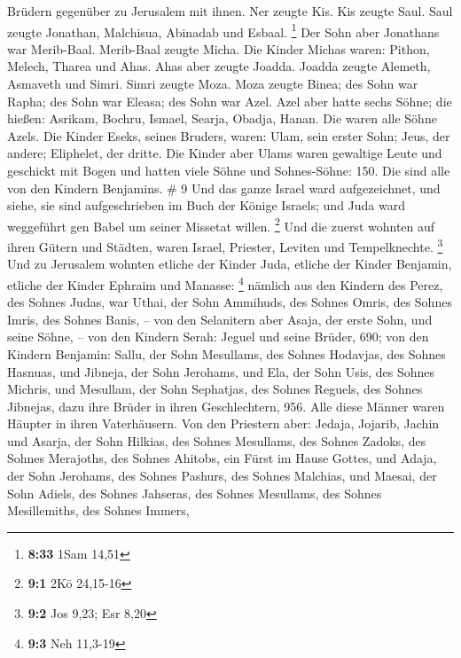 Brüdern gegenüber zu Jerusalem mit ihnen.  Ner zeugte
Kis. Kis zeugte Saul. Saul zeugte Jonathan, Malchisua, Abinadab und
Esbaal. \footnote{\textbf{8:33} 1Sam 14,51}  Der Sohn
aber Jonathans war Merib-Baal. Merib-Baal zeugte Micha. 
Die Kinder Michas waren: Pithon, Melech, Tharea und Ahas.
 Ahas aber zeugte Joadda. Joadda zeugte Alemeth, Asmaveth
und Simri. Simri zeugte Moza.  Moza zeugte Binea; des
Sohn war Rapha; des Sohn war Eleasa; des Sohn war Azel. 
Azel aber hatte sechs Söhne; die hießen: Asrikam, Bochru, Ismael,
Searja, Obadja, Hanan. Die waren alle Söhne Azels.  Die
Kinder Eseks, seines Bruders, waren: Ulam, sein erster Sohn; Jeus, der
andere; Eliphelet, der dritte.  Die Kinder aber Ulams
waren gewaltige Leute und geschickt mit Bogen und hatten viele Söhne und
Sohnes-Söhne: 150. Die sind alle von den Kindern Benjamins. \# 9
 Und das ganze Israel ward aufgezeichnet, und siehe, sie
sind aufgeschrieben im Buch der Könige Israels; und Juda ward weggeführt
gen Babel um seiner Missetat willen. \footnote{\textbf{9:1} 2Kö 24,15-16}
 Und die zuerst wohnten auf ihren Gütern und Städten,
waren Israel, Priester, Leviten und Tempelknechte. \footnote{\textbf{9:2}
  Jos 9,23; Esr 8,20}  Und zu Jerusalem wohnten etliche
der Kinder Juda, etliche der Kinder Benjamin, etliche der Kinder Ephraim
und Manasse: \footnote{\textbf{9:3} Neh 11,3-19}  nämlich
aus den Kindern des Perez, des Sohnes Judas, war Uthai, der Sohn
Ammihuds, des Sohnes Omris, des Sohnes Imris, des Sohnes Banis, --
 von den Selanitern aber Asaja, der erste Sohn, und seine
Söhne, --  von den Kindern Serah: Jeguel und seine Brüder,
690;  von den Kindern Benjamin: Sallu, der Sohn Mesullams,
des Sohnes Hodavjas, des Sohnes Hasnuas,  und Jibneja, der
Sohn Jerohams, und Ela, der Sohn Usis, des Sohnes Michris, und Mesullam,
der Sohn Sephatjas, des Sohnes Reguels, des Sohnes Jibnejas,
 dazu ihre Brüder in ihren Geschlechtern, 956. Alle diese
Männer waren Häupter in ihren Vaterhäusern.  Von den
Priestern aber: Jedaja, Jojarib, Jachin  und Asarja, der
Sohn Hilkias, des Sohnes Mesullams, des Sohnes Zadoks, des Sohnes
Merajoths, des Sohnes Ahitobs, ein Fürst im Hause Gottes,
 und Adaja, der Sohn Jerohams, des Sohnes Pashurs, des
Sohnes Malchias, und Maesai, der Sohn Adiels, des Sohnes Jahseras, des
Sohnes Mesullams, des Sohnes Mesillemiths, des Sohnes Immers,
